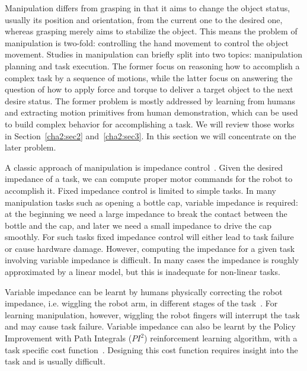 Manipulation differs from grasping in that it aims to change the object status, usually its position and orientation, from the current one to the desired one, whereas grasping merely aims to stabilize the object.
This means the problem of manipulation is two-fold: controlling the hand movement to control the object movement. Studies in manipulation can briefly split into two topics: manipulation planning and task execution. The former focus on reasoning how to accomplish a complex task by a sequence of motions, while the latter focus on answering the question of how to apply force and torque to deliver a target object to the next desire status. The former problem is mostly addressed by learning from humans and extracting motion primitives from human demonstration, which can be used to build complex behavior for accomplishing a task. We will review those works in Section~\ref{cha2:sec2} and~\ref{cha2:sec3}. In this section we will concentrate on the later problem.



A classic approach of manipulation is impedance control~\citep{howard2010transferring,wimbock2012comparison}. Given the desired impedance of a task, we can compute proper motor commands for the robot to accomplish it. Fixed impedance control is limited to simple tasks. In many manipulation tasks such as opening a bottle cap, variable impedance is required: at the beginning we need a large impedance to break the contact between the bottle and the cap, and later we need a small impedance to drive the cap smoothly. For such tasks fixed impedance control will either lead to task failure or cause hardware damage.
However, computing the impedance for a given task involving variable impedance is difficult.
In many cases the impedance is roughly approximated by a linear model, but this is inadequate for non-linear tasks.

Variable impedance can be learnt by humans physically correcting the robot impedance, i.e. wiggling the robot arm, in different stages of the task~\citep{kronander2012online}. For learning manipulation, however, wiggling the robot fingers will interrupt the task and may cause task failure.
Variable impedance can also be learnt by the Policy Improvement with Path Integrals ($PI^2$) reinforcement learning algorithm, with a task specific cost function~\citep{buchli2011learning}. Designing this cost function requires insight into the task and is usually difficult.


